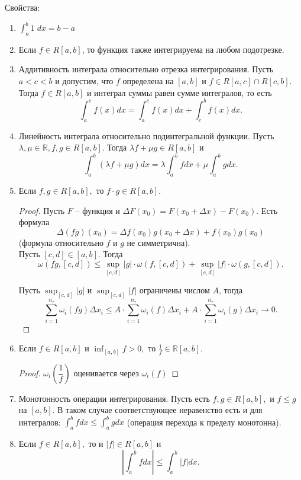 \documentclass{article}
\theoremstyle{plain}
\theoremstyle{definition}
\theoremstyle{remark}
\renewcommand{\*}{\cdot}
\begin{document}
Свойства:
\begin{enumerate}
    \item $\int_a^b 1 \; dx = b-a$
    \item Если $f \in R[a, b]$, то функция также интегрируема на любом подотрезке.
    \item Аддитивность интеграла относительно отрезка интегрирования. Пусть $a < c < b$ и допустим, что $f$ определена на $[a, b]$ и $f\in R[a, c] \cap R[c, b]$. Тогда $f\in R[a, b]$ и интеграл суммы равен сумме интегралов, то есть $$\int_a^c f(x)dx = \int_a^c f(x)dx + \int_c^b f(x)dx.$$
    \item Линейность интеграла относительно подинтегральной функции. Пусть $\lambda, \mu \in \mathbb{R}, f, g \in R[a, b].$ Тогда $\lambda f + \mu g \in R[a, b]$ и $$\int_a^b (\lambda f + \mu g)dx = \lambda \int_a^b f dx + \mu \int_a^b gdx.$$
    \item Если $f, g \in R[a, b],$ то $f \cdot g \in R[a, b]$. 
    \begin{proof} Пусть $F$ -- функция и $\Delta F(x_0) = F(x_0 + \Delta x) - F(x_0).$ Есть формула $$\Delta(fg)(x_0) = \Delta f(x_0)g(x_0 + \Delta x) + f(x_0)g(x_0)$$ (формула относительно $f$ и $g$ не симметрична).\\
    
    Пусть $[c, d] \in [a, b].$ Тогда $$\omega(fg, [c, d]) \leq \sup_{[c, d]}|g| \cdot \omega(f, [c, d]) + \sup_{[c, d]} |f| \cdot \omega(g, [c, d]).$$
    
    Пусть $\sup_{[c, d]}|g|$ и  $\sup_{[c, d]}|f|$ ограничены числом $A$, тогда 
    $$\sum_{i = 1}^{n_\tau} \omega_i(fg)\Delta x_i \leq A \cdot\sum_{i=1}^{n_{\tau}}\omega_i(f)\Delta x_i + A\cdot \sum_{i=1}^{n_{\tau}}\omega_i(g)\Delta x_i \to 0.$$
    \end{proof}
    \item Если $f\in R[a, b]$  и $\inf_{[a, b]} f > 0,$ то $\frac{1}{f} \in \mathbb{R}[a, b]$.
    \begin{proof}
    $\omega_i\left(\dfrac{1}{f}\right)$ оценивается через $\omega_i(f)$
    \end{proof}
    \item Монотонность операции интегрирования. Пусть есть $f, g \in R[a, b],$ и $f \leq g$ на $[a,b].$ В таком случае соответствующее неравенство есть и для интегралов: $\int_a^b fdx \leq \int_a^b gdx$ (операция перехода к пределу монотонна). 
    \item Если $f\in R[a, b],$ то и $|f| \in R[a, b]$ и
    \begin{equation}\label{ineq}
        \left|\int_a^b fdx\right| \leq \int_a^b|f|dx.
    \end{equation}
    

\end{enumerate}
\end{document}
